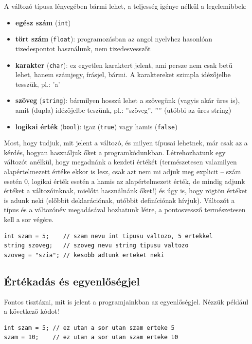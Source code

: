 \documentclass[a4paper]{article}
\begin{document}
A változó típusa lényegében bármi lehet, a teljesség igénye nélkül a legelemibbek:
\begin{itemize}
	\item \textbf{egész szám} (\lstinline{int})
	\item \textbf{tört szám} (\lstinline{float}): programozásban az angol nyelvhez hasonlóan tizedespontot használunk, nem tizedesvesszőt
	\item \textbf{karakter} (\lstinline{char}): ez egyetlen karaktert jelent, ami persze nem csak betű lehet, hanem számjegy, írásjel, bármi. A karaktereket szimpla idézőjelbe tesszük, pl.: ’a’
	\item \textbf{szöveg} (\lstinline{string}): bármilyen hosszú lehet a szövegünk (vagyis akár üres is), amit (dupla) idézőjelbe teszünk, pl.: ”szöveg”, ”” (utóbbi az üres string)
	\item \textbf{logikai érték} (\lstinline{bool}): igaz (\lstinline{true}) vagy hamis (\lstinline{false})
\end{itemize}

Most, hogy tudjuk, mit jelent a változó, és milyen típusai lehetnek, már csak az a kérdés, hogyan használjuk őket a programkódunkban. Létrehozhatunk egy változót anélkül, hogy megadnánk a kezdeti értékét (természetesen valamilyen alapértelmezett értéke ekkor is lesz, csak azt nem mi adjuk meg explicit – szám esetén 0, logikai érték esetén a hamis az alapértelmezett érték, de mindig adjunk értéket a változóinknak, mielőtt használnánk őket!) és úgy is, hogy rögtön értéket is adunk neki (előbbit deklarációnak, utóbbit definíciónak hívjuk). Változót a típus és a változónév megadásával hozhatunk létre, a pontosvessző természetesen kell a sor végére.

\begin{lstlisting}[caption=Változók, label=lst:variables]
int szam = 5;    // szam nevu int tipusu valtozo, 5 ertekkel
string szoveg;   // szoveg nevu string tipusu valtozo
szoveg = "szia"; // kesobb adtunk erteket neki
\end{lstlisting}

\subsection{Értékadás és egyenlőségjel}
Fontos tisztázni, mit is jelent a programjainkban az egyenlőségjel. Nézzük például a következő kódot!

\begin{lstlisting}[caption=Értékadás, label=lst:assignment]
int szam = 5; // ez utan a sor utan szam erteke 5
szam = 10;    // ez utan a sor utan szam erteke 10
\end{lstlisting}
\end{document}
